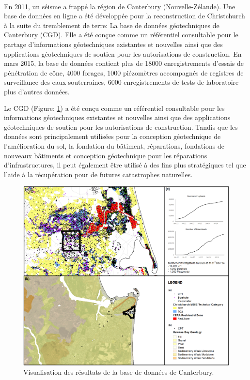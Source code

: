 
\paragraph{}
En 2011, un séisme a frappé la région de Canterbury (Nouvelle-Zélande). Une base de données en ligne a été développée pour
la reconstruction de Christchurch à la suite du tremblement de terre:
La base de données géotechniques de Canterbury (CGD). Elle
a été conçue comme un référentiel consultable pour le partage d'informations géotechniques existantes et nouvelles
ainsi que des applications géotechniques de soutien pour les autorisations de construction. En mars
2015, la base de données contient plus de 18000 enregistrements d'essais de pénétration de cône, 4000 forages, 1000
piézomètres accompagnés de registres de surveillance des eaux souterraines, 6000 enregistrements de tests de laboratoire
plus d'autres données. 

\par
Le CGD (Figure: \ref{fig:canterbury}) a été conçu comme un référentiel consultable pour les informations géotechniques existantes et nouvelles
ainsi que des applications géotechniques de soutien pour les autorisations de construction. Tandis que
les données sont principalement utilisées pour la conception géotechnique de l'amélioration du sol, la fondation du bâtiment,
réparations, fondations de nouveaux bâtiments et conception géotechnique pour les réparations d'infrastructures, il peut
également être utilisé à des fins plus stratégiques tel que l'aide à la récupération pour de futures
catastrophes naturelles.
\cite{scott2015benefits}

\begin{figure}[t]
    \centering
    \includegraphics[width=1\textwidth]{images/Contexte/cgd.png}
    \caption{Visualisation des résultats de la base de données de Canterbury.}
    \label{fig:canterbury}
\end{figure}

